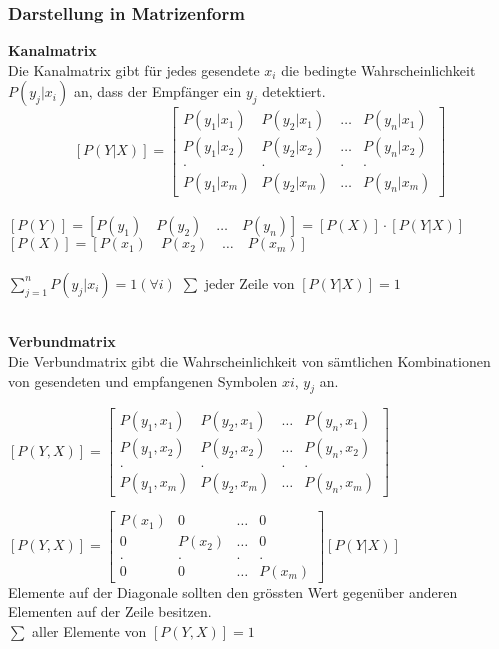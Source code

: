 \subsubsection{Darstellung in Matrizenform}
\begin{minipage}[t]{9cm}
	\textbf{Kanalmatrix}\\
	Die Kanalmatrix gibt für jedes gesendete $x_i$ die bedingte Wahrscheinlichkeit $P(y_j|x_i)$ an, dass der Empfänger ein $y_j$ detektiert.
 	$$ \boxed{[P(Y | X)] = \begin{bmatrix}
              P(y_1 | x_1) & P(y_2 | x_1) & \ldots & P(y_n | x_1) \\
              P(y_1 | x_2) & P(y_2 | x_2) & \ldots & P(y_n | x_2) \\
             . & . & . & . \\
              P(y_1 | x_m) & P(y_2 | x_m) & \ldots & P(y_n | x_m)
           \end{bmatrix}}$$ \\
	$ [P(Y)] = [P(y_1) \quad P(y_2) \quad \ldots \quad P(y_n)] = [P(X)] \cdot [P(Y|X)]$ \\
	$ [P(X)] = [P(x_1) \quad P(x_2) \quad \ldots \quad P(x_m)]$ \\ \\
	$\sum\limits_{j=1}^n P(y_j | x_i) = 1 (\forall i)$ \qquad $\sum$ jeder Zeile von $[P(Y|X)]=1$\\ \\
\end{minipage}
\hspace{0.5cm}
\begin{minipage}[t]{9cm}
	\textbf{Verbundmatrix}\\
	Die Verbundmatrix gibt die Wahrscheinlichkeit von sämtlichen Kombinationen von gesendeten und empfangenen Symbolen $xi$, $y_j$ an.
	\begin{center}$ \boxed{[P(Y,X)] = \begin{bmatrix}
              P(y_1, x_1) & P(y_2, x_1) & \ldots & P(y_n, x_1) \\
              P(y_1, x_2) & P(y_2, x_2) & \ldots & P(y_n, x_2) \\
             . & . & . & . \\
              P(y_1, x_m) & P(y_2, x_m) & \ldots & P(y_n, x_m)
           \end{bmatrix}}$
	\end{center}
	$  [P(Y,X)] =  \begin{bmatrix}
    	P(x_1) & 0 & \ldots & 0 \\
    	0 & P(x_2) & \ldots & 0 \\
    	. & . & . & . \\
    	0 & 0 & \ldots & P(x_m)
    \end{bmatrix} [P(Y|X)] $\\ 
	Elemente auf der Diagonale sollten den grössten Wert gegenüber anderen Elementen auf der Zeile
	besitzen. \\
	$\sum $ aller Elemente von $[P(Y,X)] = 1$
\end{minipage}

